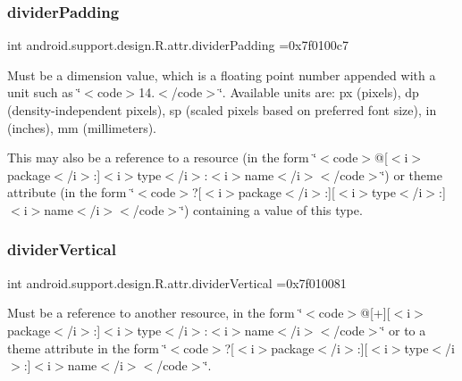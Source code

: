 \subsubsection{\texorpdfstring{divider\+Padding}{dividerPadding}}
{\footnotesize\ttfamily int android.\+support.\+design.\+R.\+attr.\+divider\+Padding =0x7f0100c7\hspace{0.3cm}{\ttfamily [static]}}

Must be a dimension value, which is a floating point number appended with a unit such as \char`\"{}$<$code$>$14.\+5sp$<$/code$>$\char`\"{}. Available units are\+: px (pixels), dp (density-\/independent pixels), sp (scaled pixels based on preferred font size), in (inches), mm (millimeters). 

This may also be a reference to a resource (in the form \char`\"{}$<$code$>$@\mbox{[}$<$i$>$package$<$/i$>$\+:\mbox{]}$<$i$>$type$<$/i$>$\+:$<$i$>$name$<$/i$>$$<$/code$>$\char`\"{}) or theme attribute (in the form \char`\"{}$<$code$>$?\mbox{[}$<$i$>$package$<$/i$>$\+:\mbox{]}\mbox{[}$<$i$>$type$<$/i$>$\+:\mbox{]}$<$i$>$name$<$/i$>$$<$/code$>$\char`\"{}) containing a value of this type. \mbox{\label{classandroid_1_1support_1_1design_1_1R_1_1attr_a994f6b92e9866888f5c764eedab456f9}} 
\subsubsection{\texorpdfstring{divider\+Vertical}{dividerVertical}}
{\footnotesize\ttfamily int android.\+support.\+design.\+R.\+attr.\+divider\+Vertical =0x7f010081\hspace{0.3cm}{\ttfamily [static]}}

Must be a reference to another resource, in the form \char`\"{}$<$code$>$@\mbox{[}+\mbox{]}\mbox{[}$<$i$>$package$<$/i$>$\+:\mbox{]}$<$i$>$type$<$/i$>$\+:$<$i$>$name$<$/i$>$$<$/code$>$\char`\"{} or to a theme attribute in the form \char`\"{}$<$code$>$?\mbox{[}$<$i$>$package$<$/i$>$\+:\mbox{]}\mbox{[}$<$i$>$type$<$/i$>$\+:\mbox{]}$<$i$>$name$<$/i$>$$<$/code$>$\char`\"{}. \mbox{\label{classandroid_1_1support_1_1design_1_1R_1_1attr_a74f0ef8703109da7b9564fb1dd4c2a70}} 
